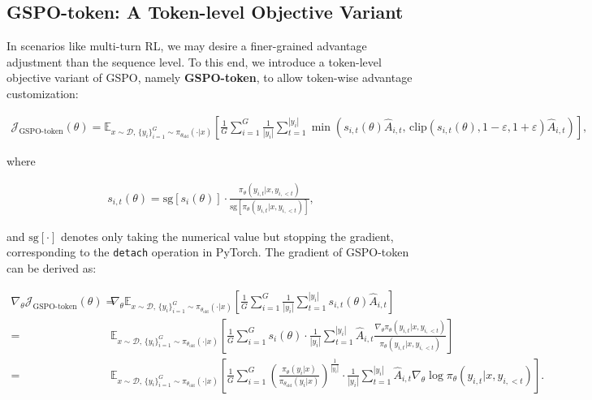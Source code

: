 \subsection{GSPO-token: A Token-level Objective Variant}

In scenarios like multi-turn RL, we may desire a finer-grained advantage adjustment than the sequence level. To this end, we introduce a token-level objective variant of GSPO, namely \textbf{GSPO-token}, to allow token-wise advantage customization:

\begin{align}
\mathcal{J}_\text{GSPO-token}(\theta)
=
\mathbb{E}_{ x \sim \mathcal{D},\, \{y_i\}_{i=1}^G \sim \pi_{\theta_\text{old}}( \cdot | x) }
\left[ 
\frac{1}{G} \sum_{i=1}^{G} \frac{1}{|y_i|} \sum_{t=1}^{|y_i|} 
\min \left( s_{i,t}(\theta) \widehat{A}_{i,t},  \, \mathrm{clip} \left( s_{i,t}(\theta), 1 - {\varepsilon}, 1 + {\varepsilon} \right) \widehat{A}_{i,t} \right) 
\right],
\label{equ:gspo-token}
\end{align}

where

\begin{align}
s_{i,t}(\theta) 
= \mathrm{sg} \left[ s_{i}(\theta) \right]  \cdot \frac{ \pi_{\theta} (y_{i,t} | x, y_{i,<t}) }{ \mathrm{sg} \left[ \pi_{\theta} (y_{i,t} | x, y_{i,<t}) \right] },
\end{align}

and $\mathrm{sg}[\cdot]$ denotes only taking the numerical value but stopping the gradient, corresponding to the \texttt{detach} operation in PyTorch. The gradient of GSPO-token can be derived as:

\begin{align}
\nabla_{\theta} \mathcal{J}_\text{GSPO-token}(\theta)
=&\ 
\nabla_{\theta} \mathbb{E}_{ x \sim \mathcal{D},\, \{y_i\}_{i=1}^G \sim \pi_{\theta_\text{old}}( \cdot | x) }
\left[ 
\frac{1}{G} \sum_{i=1}^{G}
\frac{1}{|y_i|} \sum_{t=1}^{|y_i|} 
s_{i,t}(\theta) \widehat{A}_{i,t}
\right] \\
=&\ 
\mathbb{E}_{ x \sim \mathcal{D},\, \{y_i\}_{i=1}^G \sim \pi_{\theta_\text{old}}( \cdot | x) }
\left[ 
\frac{1}{G} \sum_{i=1}^{G} s_i (\theta) \cdot \frac{1}{|y_i|} \sum_{t=1}^{|y_i|} 
\widehat{A}_{i,t} \frac{ \nabla_{\theta} \pi_{\theta} (y_{i,t} | x, y_{i,<t}) }{ \pi_{\theta} (y_{i,t} | x, y_{i,<t}) }
\right] \\
=&\ 
\mathbb{E}_{ x \sim \mathcal{D},\, \{y_i\}_{i=1}^G \sim \pi_{\theta_\text{old}}( \cdot | x) }
\left[ 
\frac{1}{G} \sum_{i=1}^{G}  \left( \frac{ \pi_{\theta} (y_i | x) }{ \pi_{\theta_\text{old}} (y_i | x)} \right)^{\frac{1}{|y_i|}}
\cdot \frac{1}{|y_i|} \sum_{t=1}^{|y_i|}
\widehat{A}_{i,t} \nabla_{\theta} \log \pi_{\theta} (y_{i,t} | x, y_{i,<t})  
\right].
\label{equ:gspo-token_grad}
\end{align}

